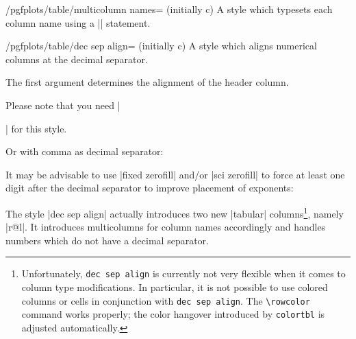 \begin{stylekey}{/pgfplots/table/multicolumn names= (initially c)}
	A style which typesets each column name using a || statement.
\end{stylekey}

\begin{stylekey}{/pgfplots/table/dec sep align= (initially c)}
	A style which aligns numerical columns at the decimal separator.

	The first argument determines the alignment of the header column. 

	Please note that you need |\usepackage{array}| for this style.
\begin{codeexample}[]
\end{codeexample}

	Or with comma as decimal separator:
\begin{codeexample}[]
\end{codeexample}
	It may be advisable to use |fixed zerofill| and/or |sci zerofill| to force at least one digit after the decimal separator to improve placement of exponents:
\begin{codeexample}[]
\end{codeexample}

	The style |dec sep align| actually introduces two new |tabular| columns\footnote{Unfortunately, \texttt{dec sep align} is currently not very flexible when it comes to column type modifications. In particular, it is not possible to use colored columns or cells in conjunction with \texttt{dec sep align}. The \texttt{\textbackslash rowcolor} command works properly; the color hangover introduced by \texttt{colortbl} is adjusted automatically.}, namely |r@{}l|. It introduces multicolumns for column names accordingly and handles numbers which do not have a decimal separator. 
	


\end{stylekey}
